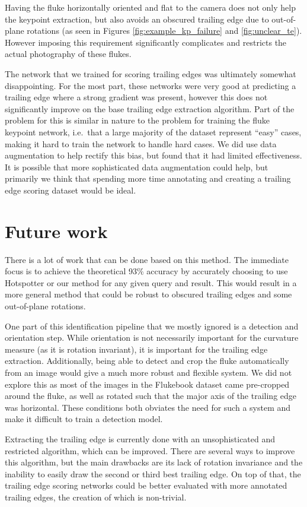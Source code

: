 Having the fluke horizontally oriented and flat to the camera does not only help the keypoint extraction, but also avoids an obscured trailing edge due to out-of-plane rotations (as seen in Figures \ref{fig:example_kp_failure} and \ref{fig:unclear_te}).
However imposing this requirement significantly complicates and restricts the actual photography of these flukes.

The network that we trained for scoring trailing edges was ultimately somewhat disappointing.
For the most part, these networks were very good at predicting a trailing edge where a strong gradient was present, however this does not significantly improve on the base trailing edge extraction algorithm.
Part of the problem for this is similar in nature to the problem for training the fluke keypoint network, i.e.\ that a large majority of the dataset represent ``easy'' cases, making it hard to train the network to handle hard cases.
We did use data augmentation to help rectify this bias, but found that it had limited effectiveness.
It is possible that more sophisticated data augmentation could help, but primarily we think that spending more time annotating and creating a trailing edge scoring dataset would be ideal.

\section{Future work}

There is a lot of work that can be done based on this method.
The immediate focus is to achieve the theoretical 93\% accuracy by accurately choosing to use Hotspotter or our method for any given query and result.
This would result in a more general method that could be robust to obscured trailing edges and some out-of-plane rotations.

One part of this identification pipeline that we mostly ignored is a detection and orientation step.
While orientation is not necessarily important for the curvature measure (as it is rotation invariant), it is important for the trailing edge extraction.
Additionally, being able to detect and crop the fluke automatically from an image would give a much more robust and flexible system.
We did not explore this as most of the images in the Flukebook dataset came pre-cropped around the fluke, as well as rotated such that the major axis of the trailing edge was horizontal.
These conditions both obviates the need for such a system and make it difficult to train a detection model.

Extracting the trailing edge is currently done with an unsophisticated and restricted algorithm, which can be improved. 
There are several ways to improve this algorithm, but the main drawbacks are its lack of rotation invariance and the inability to easily draw the second or third best trailing edge.
On top of that, the trailing edge scoring networks could be better evaluated with more annotated trailing edges, the creation of which is non-trivial.

